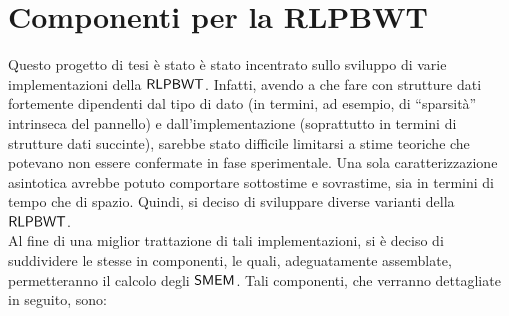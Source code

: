 \section{Componenti per la RLPBWT}
Questo progetto di tesi è stato è stato incentrato sullo sviluppo di
varie implementazioni della $\mbox{\rm {\sf RLPBWT}}$. Infatti, avendo a che fare con
strutture dati fortemente dipendenti dal tipo di dato (in termini, ad esempio,
di ``sparsità'' intrinseca del pannello) e dall'implementazione (soprattutto in
termini di strutture dati succinte), sarebbe stato difficile limitarsi a stime
teoriche che potevano non essere confermate in fase sperimentale. Una sola
caratterizzazione asintotica avrebbe potuto comportare sottostime e
sovrastime, sia in termini di tempo che di spazio. Quindi, si deciso di
sviluppare diverse varianti della $\mbox{\rm {\sf RLPBWT}}$.\\ 
Al fine di una miglior trattazione di tali implementazioni, si è deciso di
suddividere le stesse in componenti, le quali, adeguatamente
assemblate, permetteranno il calcolo degli
$\mbox{\rm {\sf SMEM}}$. Tali componenti, che verranno dettagliate in seguito, sono:
